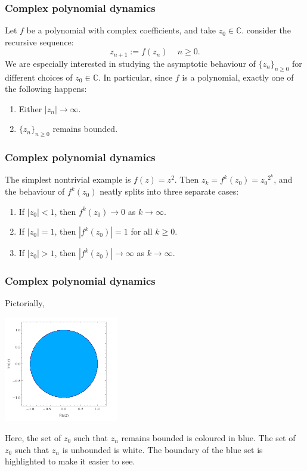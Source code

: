 \documentclass{beamer} %
\theoremstyle{definition} %
\newcommand{\Cplx}{\mathbb{C}}
\begin{document}
\begin{frame}\frametitle{Complex polynomial dynamics}
    Let $f$ be a polynomial with complex coefficients, and take
    $z_0 \in \Cplx$. consider the recursive sequence:
    \begin{equation*}
        z_{n+1} := f(z_n)\,\quad n\geq 0.
    \end{equation*}
    We are especially interested in studying the asymptotic behaviour of $\{z_n\}_{n\geq 0}$
    for different choices of $z_0 \in \Cplx$. In particular, since $f$ is a polynomial, exactly one of the following happens:
    \begin{enumerate}
        \item{} Either $|z_n| \to\infty$.
        \item{} $\{z_n\}_{n\geq 0}$ remains bounded.
    \end{enumerate}
\end{frame}

\begin{frame}\frametitle{Complex polynomial dynamics}
    The simplest nontrivial example is $f(z) = z^2$. Then $z_k = f^k(z_0) = {z_0}^{2^k}$, and the behaviour
    of $f^{k}(z_0)$ neatly splits into three separate cases:
    \begin{enumerate}
        \item{} If $|z_0| < 1$, then $f^k(z_0)\to 0$ as $k\to\infty$.
        \item{} If $|z_0| = 1$, then $|f^k(z_0)| = 1$ for all $k\geq 0$.
        \item{} If $|z_0| > 1$, then $|f^k(z_0)| \to \infty$ as $k\to\infty$.
    \end{enumerate}
\end{frame}

\begin{frame}\frametitle{Complex polynomial dynamics}
    Pictorially,    
    \begin{center}
    \includegraphics[width=50mm]{img/circle-filled.png}
    \end{center}
    Here, the set of $z_0$ such that $z_n$ remains bounded is coloured in blue. The set of $z_0$ such that $z_n$ is 
    unbounded is white. The boundary of the blue set is highlighted to make it easier to see.
\end{frame}
\end{document}
